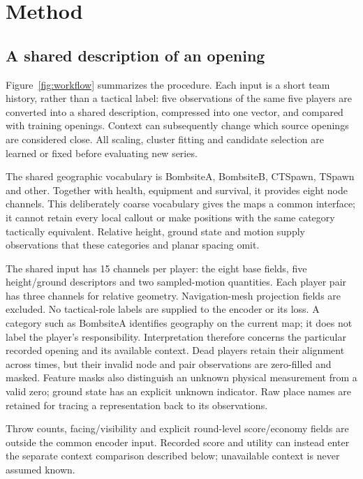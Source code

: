\section{Method}
\subsection{A shared description of an opening}
Figure~\ref{fig:workflow} summarizes the procedure. Each input is a short team history, rather than a tactical label: five observations of the same five players are converted into a shared description, compressed into one vector, and compared with training openings. Context can subsequently change which source openings are considered close. All scaling, cluster fitting and candidate selection are learned or fixed before evaluating new series. %

The shared geographic vocabulary is BombsiteA, BombsiteB, CTSpawn, TSpawn and other. Together with health, equipment and survival, it provides eight node channels. This deliberately coarse vocabulary gives the maps a common interface; it cannot retain every local callout or make positions with the same category tactically equivalent. Relative height, ground state and motion supply observations that these categories and planar spacing omit.

The shared input has 15 channels per player: the eight base fields, five height/ground descriptors and two sampled-motion quantities. Each player pair has three channels for relative geometry. Navigation-mesh projection fields are excluded. %
No tactical-role labels are supplied to the encoder or its loss. A category such as BombsiteA identifies geography on the current map; it does not label the player's responsibility. Interpretation therefore concerns the particular recorded opening and its available context. %
Dead players retain their alignment across times, but their invalid node and pair observations are zero-filled and masked. Feature masks also distinguish an unknown physical measurement from a valid zero; ground state has an explicit unknown indicator. Raw place names are retained for tracing a representation back to its observations. %

Throw counts, facing/visibility and explicit round-level score/economy fields are outside the common encoder input. Recorded score and utility can instead enter the separate context comparison described below; unavailable context is never assumed known. %

